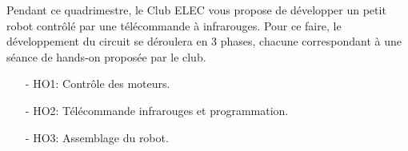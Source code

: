 Pendant ce quadrimestre, le Club ELEC vous propose de développer un petit robot contrôlé par une télécommande à infrarouges. Pour ce faire, le développement du circuit se déroulera en 3 phases, chacune correspondant à une séance de hands-on proposée par le club.

\begin{itemize}
	\item[-] HO1: Contrôle des moteurs.
	\item[-] HO2: Télécommande infrarouges et programmation.
	\item[-] HO3: Assemblage du robot.
\end{itemize}